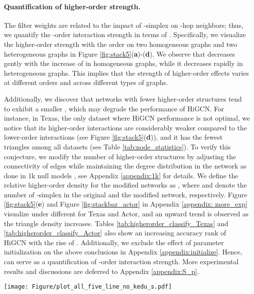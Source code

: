 \documentclass[letterpaper]{article} \usepackage{aaai24}
\theoremstyle{plain}
\theoremstyle{definition}
\theoremstyle{remark}
\begin{document}
\paragraph{Quantification of higher-order strength.}
The filter weights  are related to the impact of -simplex on -hop neighbors; thus, we quantify the -order interaction strength in terms of .
Specifically, we visualize the higher-order strength with the order  on two homogeneous graphs and two heterogeneous graphs in Figure \ref{fig:stack5}(\textbf{a})-(\textbf{d}).
We observe that  decreases gently with the increase of  in homogeneous graphs, while it decreases rapidly in heterogeneous graphs. 
This implies that the strength of higher-order effects varies at different orders and across different types of graphs. 


Additionally, we discover that networks with fewer higher-order structures tend to exhibit a smaller , which may degrade the performance of HiGCN.
For instance, in Texas, the only dataset where HiGCN performance is not optimal, we notice that its higher-order interactions are considerably weaker compared to the lower-order interactions (see Figure \ref{fig:stack5}(\textbf{d})), and it has the fewest triangles among all datasets (see Table \ref{tab:node_statistics}).
To verify this conjecture, we modify the number of higher-order structures by adjusting the connectivity of edges while maintaining the degree distribution in the network as done in 1k null models \cite{nullmodel}, see Appendix \ref{appendix:1k} for details. 
We define the relative higher-order density for the modified networks as
,
where  and  denote the number of -simplex in the original and the modified network, respectively.
Figure \ref{fig:stack5}(\textbf{e}) and Figure \ref{fig:stackbar_actor} in Appendix \ref{appendix: more_exp} visualize  under different  for Texas and Actor, and an upward trend is observed as the triangle density  increases.
Tables \ref{tab:higherorder_classify_Texas} and \ref{tab:higherorder_classify_Actor} also show an increasing accuracy rank of HiGCN with the rise of .
Additionally, we exclude the effect of parameter initialization on the above conclusions in Appendix \ref{appendix:initialize}.
Hence,  can serve as a  quantification of -order interaction strength. More experimental results and discussions are deferred to Appendix \ref{appendix:S_p}.



\begin{figure*}[!t]
\centering
\texttt{[image: Figure/plot\_all\_five\_line\_no\_kedu\_s.pdf]}
\caption{{\bf a, b, c} and {\bf d} visualizes the stack of learned weights  under order . \textbf{e} visualizes the stack of  for Texas under various relative triangle densities .}
\label{fig:stack5}
\end{figure*}
\end{document}
